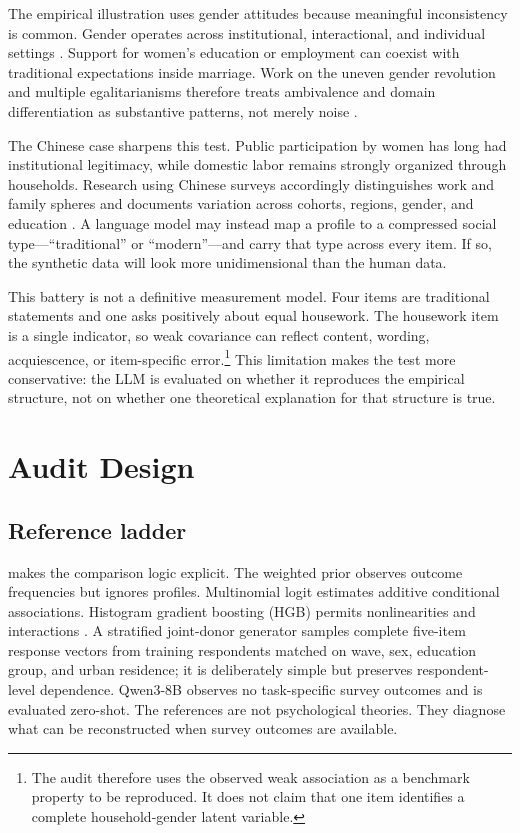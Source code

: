 \documentclass[10pt,twocolumn]{article}
\newcommand{\HGB}{HGB\xspace}
\begin{document}
The empirical illustration uses gender attitudes because meaningful inconsistency is common.
Gender operates across institutional, interactional, and individual settings
\parencite{risman2004gender}. Support for women's education or employment can coexist with
traditional expectations inside marriage. Work on the uneven gender revolution and multiple
egalitarianisms therefore treats ambivalence and domain differentiation as substantive patterns,
not merely noise \parencite{england2010gender,knight2017egalitarianism,scarborough2019attitudes}.

The Chinese case sharpens this test. Public participation by women has long had institutional
legitimacy, while domestic labor remains strongly organized through households. Research using
Chinese surveys accordingly distinguishes work and family spheres and documents variation across
cohorts, regions, gender, and education
\parencite{shu2004education,qian2020separating,yang2023mosaic}. A language model may instead map a
profile to a compressed social type---``traditional'' or ``modern''---and carry that type across
every item. If so, the synthetic data will look more unidimensional than the human data.

This battery is not a definitive measurement model. Four items are traditional statements and one
asks positively about equal housework. The housework item is a single indicator, so weak covariance
can reflect content, wording, acquiescence, or item-specific error.\footnote{The audit therefore
uses the observed weak association as a benchmark property to be reproduced. It does not claim that
one item identifies a complete household-gender latent variable.} This limitation makes the test
more conservative: the LLM is evaluated on whether it reproduces the empirical structure, not on
whether one theoretical explanation for that structure is true.

\section{Audit Design}

\subsection{Reference ladder}

 makes the comparison logic explicit. The weighted prior observes outcome
frequencies but ignores profiles. Multinomial logit estimates additive conditional associations.
Histogram gradient boosting (\HGB) permits nonlinearities and interactions
\parencite{mullainathan2017machine,pedregosa2011scikit}. A stratified joint-donor generator samples
complete five-item response vectors from training respondents matched on wave, sex, education
group, and urban residence; it is deliberately simple but preserves respondent-level dependence.
Qwen3-8B observes no task-specific survey outcomes and is evaluated zero-shot. The references are
not psychological theories. They diagnose what can be reconstructed when survey outcomes are
available.
\end{document}
